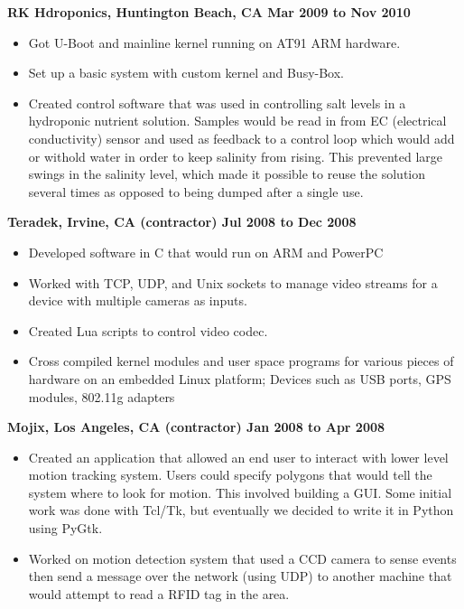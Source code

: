 \documentclass{res}
\begin{document}
\begin{resume}
{\large \bf RK Hdroponics, Huntington Beach, CA \hfill Mar 2009 to Nov 2010}
\begin{itemize}
\item Got U-Boot and mainline kernel running on AT91 ARM hardware.
\item Set up a basic system with custom kernel and Busy-Box.
\item Created control software that was used in controlling salt levels
in a hydroponic nutrient solution.  Samples would be read in from
EC (electrical conductivity) sensor and used as feedback to a control
loop which would add or withold water in order to keep salinity from rising.
This prevented large swings in the salinity level, which made it possible
to reuse the solution several times as opposed to being dumped after a 
single use.
\end{itemize}

{\large \bf Teradek, Irvine, CA (contractor) \hfill Jul 2008 to Dec 2008}
\begin{itemize}
\item Developed software in C that would run on ARM and PowerPC
\item Worked with TCP, UDP, and Unix sockets to manage video streams for
a device with multiple cameras as inputs.
\item Created Lua scripts to control video codec.
\item Cross compiled kernel modules and user space programs for various
pieces of hardware on an embedded Linux platform; Devices such as USB
ports, GPS modules, 802.11g adapters
\end{itemize}

{\large \bf Mojix, Los Angeles, CA (contractor) \hfill Jan 2008 to Apr 2008}
\begin{itemize}

\item Created an application that allowed an end user to interact
with lower level motion tracking system.  Users could specify polygons
that would tell the system where to look for motion.  This involved
building a GUI.  Some initial work was done with Tcl/Tk, but eventually
we decided to write it in Python using PyGtk.

\item Worked on motion detection system that used a CCD camera to sense
events then send a message over the network (using UDP) to another
machine that would attempt to read a RFID tag in the area.

\end{itemize}


\end{resume}
\end{document}
